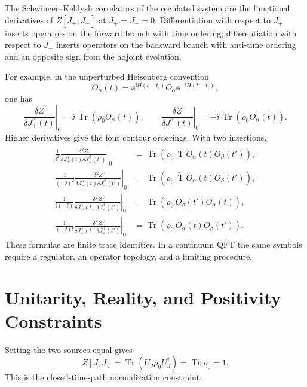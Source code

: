 \begin{definition}
\label{def:closed-time-path-correlators}
The Schwinger--Keldysh correlators of the regulated system are the
functional derivatives of \(Z[J_+,J_-]\) at \(J_+=J_-=0\).  Differentiation
with respect to \(J_+\) inserts operators on the forward branch with time
ordering; differentiation with respect to \(J_-\) inserts operators on the
backward branch with anti-time ordering and an opposite sign from the
adjoint evolution.
\end{definition}

For example, in the unperturbed Heisenberg convention
\[
  O_\alpha(t)=\ee^{\ii H(t-t_i)}O_\alpha\ee^{-\ii H(t-t_i)},
\]
one has
\[
  \left.
  \frac{\delta Z}{\delta J_+^\alpha(t)}
  \right|_{0}
  =
  \ii\,\operatorname{Tr}(\rho_0 O_\alpha(t)),
  \qquad
  \left.
  \frac{\delta Z}{\delta J_-^\alpha(t)}
  \right|_{0}
  =
  -\ii\,\operatorname{Tr}(\rho_0 O_\alpha(t)).
\]
Higher derivatives give the four contour orderings.  With two insertions,
\begin{align}
  \left.
  \frac{1}{\ii^2}
  \frac{\delta^2Z}{\delta J_+^\alpha(t)\delta J_+^\beta(t')}
  \right|_{0}
  &=
  \operatorname{Tr}\!\left(
    \rho_0\,\operatorname{T}O_\alpha(t)O_\beta(t')\right),\\
  \left.
  \frac{1}{(-\ii)^2}
  \frac{\delta^2Z}{\delta J_-^\alpha(t)\delta J_-^\beta(t')}
  \right|_{0}
  &=
  \operatorname{Tr}\!\left(
    \rho_0\,\widetilde{\operatorname{T}}O_\alpha(t)O_\beta(t')\right),\\
  \left.
  \frac{1}{\ii(-\ii)}
  \frac{\delta^2Z}{\delta J_+^\alpha(t)\delta J_-^\beta(t')}
  \right|_{0}
  &=
  \operatorname{Tr}\!\left(\rho_0\,O_\beta(t')O_\alpha(t)\right),\\
  \left.
  \frac{1}{(-\ii)\ii}
  \frac{\delta^2Z}{\delta J_-^\alpha(t)\delta J_+^\beta(t')}
  \right|_{0}
  &=
  \operatorname{Tr}\!\left(\rho_0\,O_\alpha(t)O_\beta(t')\right).
\end{align}
These formulae are finite trace identities.  In a continuum QFT the same
symbols require a regulator, an operator topology, and a limiting procedure.

\section{Unitarity, Reality, and Positivity Constraints}

Setting the two sources equal gives
\begin{equation}
  Z[J,J]
  =
  \operatorname{Tr}(U_J\rho_0U_J^\dagger)
  =
  \operatorname{Tr}\rho_0
  =
  1 .
  \label{eq:sk-unitarity-normalization}
\end{equation}
This is the closed-time-path normalization constraint.

